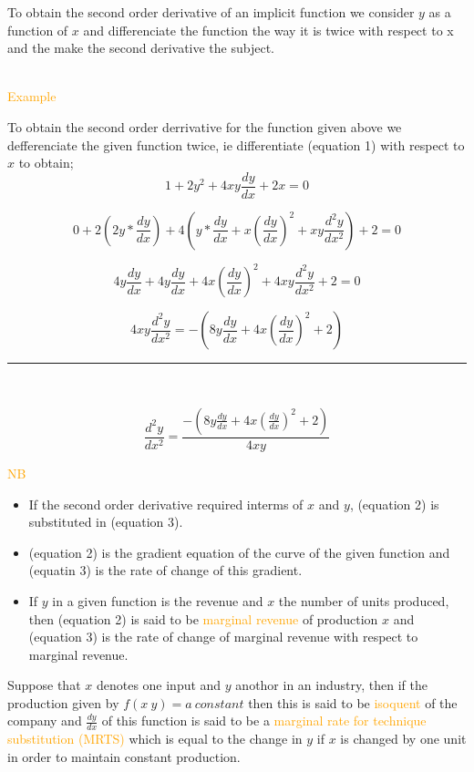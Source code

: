 \documentclass{article}
\begin{document}
To obtain the second order derivative of an implicit function we consider $y$ as a function of $x$ and differenciate the function the way it is twice with respect to x and the make the second derivative the subject. \\ \

\centerline{\textcolor{orange}{Example}} 

To obtain the second order derrivative for the function given above we defferenciate the given  function twice, ie differentiate (equation 1) with respect to $x$ to obtain; 
$$1+2y^2+4xy\frac{dy}{dx}+2x=0$$

$$0+2\left(2y*\frac{dy}{dx}\right)+4\left(y*\frac{dy}{dx}+x\left(\frac{dy}{dx}\right)^2+xy\frac{d^2y}{dx^2}\right)+2=0$$

$$4y\frac{dy}{dx}+4y\frac{dy}{dx}+4x\left(\frac{dy}{dx}\right)^2+4xy\frac{d^2y}{dx^2}+2=0$$

$$4xy\frac{d^2y}{dx^2}=-\left(8y\frac{dy}{dx}+4x\left(\frac{dy}{dx}\right)^2+2\right)$$

\hrule \

\[
\frac{d^2y}{dx^2}=\frac{-\left(8y\frac{dy}{dx}+4x\left(\frac{dy}{dx}\right)^2+2\right)}{4xy}  \tag {equation 3}
\]

\textcolor{orange}{NB} \\

\begin {itemize}
	\item If the second order derivative required interms of $x$ and $y$, (equation 2) is substituted in (equation 3).
	\item (equation 2) is the gradient equation of the curve of the given function and (equatin 3) is the rate of change of this gradient.
	\item If $y$ in a given function is the revenue and $x$ the number of units produced, then (equation 2) is said to be \textcolor{orange}{marginal revenue} of production $x$ and (equation 3) is the rate of change of marginal revenue with respect to marginal revenue.
\end {itemize}

Suppose that $x$ denotes one input and $y$ anothor in an industry, then if the production given by $f(x\ y)=a\ constant$ then this is said to be \textcolor{orange}{isoquent} of the company and $\frac{dy}{dx}$ of this function is said to be a \textcolor{orange}{marginal rate for technique substitution (MRTS)} which is equal to the change in $y$ if $x$ is changed by one unit in order to maintain constant production. \\ \
\end{document}
